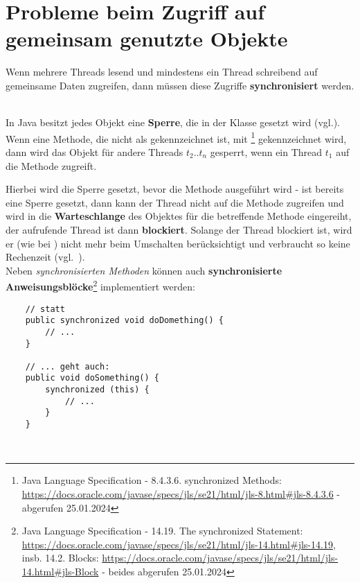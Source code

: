 \section{Probleme beim Zugriff auf gemeinsam genutzte Objekte}

\begin{tcolorbox}
   Wenn mehrere Threads lesend und mindestens ein Thread schreibend auf gemeinsame Daten zugreifen, dann müssen diese Zugriffe \textbf{synchronisiert} werden.
\end{tcolorbox}\\

In Java besitzt jedes Objekt eine \textbf{Sperre}, die in der Klasse  gesetzt wird (vgl.\cite[26]{Oec22}).\\

Wenn eine Methode, die nicht als  gekennzeichnet ist, mit \footnote{
    Java Language Specification - 8.4.3.6. synchronized Methods: \url{https://docs.oracle.com/javase/specs/jls/se21/html/jls-8.html#jls-8.4.3.6} - abgerufen 25.01.2024
} gekennzeichnet wird, dann wird das Objekt für andere Threads $t_2..t_n$ gesperrt, wenn ein Thread $t_1$ auf die Methode zugreift.

Hierbei wird die Sperre gesetzt, bevor die Methode ausgeführt wird - ist bereits eine Sperre gesetzt, dann kann der Thread nicht auf die Methode zugreifen und wird in die \textbf{Warteschlange} des Objektes für die betreffende Methode eingereiht, der aufrufende Thread ist dann \textbf{blockiert}.
Solange der Thread blockiert ist, wird er (wie bei ) nicht mehr beim Umschalten berücksichtigt und verbraucht so keine Rechenzeit (vgl.~\cite[26]{Oec22}).
\\

Neben \textit{synchronisierten Methoden} können auch \textbf{synchronisierte Anweisungsblöcke}\footnote{
Java Language Specification - 14.19. The synchronized Statement: \url{https://docs.oracle.com/javase/specs/jls/se21/html/jls-14.html#jls-14.19}, insb. 14.2. Blocks: \url{https://docs.oracle.com/javase/specs/jls/se21/html/jls-14.html#jls-Block} - beides abgerufen 25.01.2024
} implementiert werden:\\

\begin{verbatim}
    // statt
    public synchronized void doDomething() {
        // ...
    }

    // ... geht auch:
    public void doSomething() {
        synchronized (this) {
            // ...
        }
    }
\end{verbatim}\\

